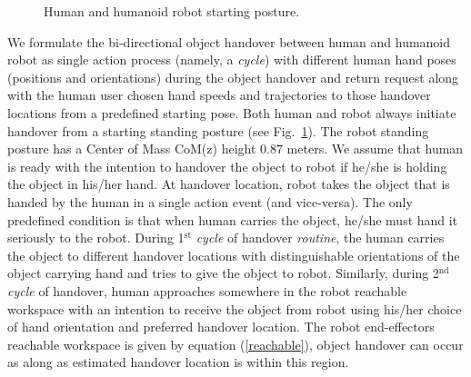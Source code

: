 \begin{figure}[htbp]
	\caption{Human and humanoid robot starting posture.}
	\label{fig:halfsit}
\end{figure}

We formulate the bi-directional object handover between human and humanoid robot as single action process (namely, a \textit{cycle}) with different human hand poses (positions and orientations) during the object handover and return request along with the human user chosen hand speeds and trajectories to those handover locations from a predefined starting pose. Both human and robot always initiate handover from a starting standing posture (see Fig.~\ref{fig:halfsit}). The robot standing posture has a Center of Mass CoM(z) height $0.87$ meters. We assume that human is ready with the intention to handover the object to robot if he/she is holding the object in his/her hand. At handover location, robot takes the object that is handed by the human in a single action event (and vice-versa). The only predefined condition is that when human carries the object, he/she must hand it seriously to the robot. During 1$^\text{st}$ \textit{cycle} of handover \textit{routine}, the human carries the object to different handover locations with distinguishable orientations of the object carrying hand and tries to give the object to robot. Similarly, during 2$^\text{nd}$ \textit{cycle} of handover, human approaches somewhere in the robot reachable workspace with an intention to receive the object from robot using his/her choice of hand orientation and preferred handover location. The robot end-effectors reachable workspace is given by equation (\ref{reachable}), object handover can occur as along as estimated handover location is within this region.

